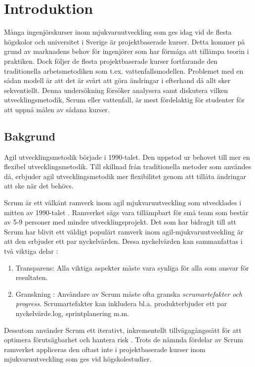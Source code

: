 \section{Introduktion}
\label{sec:Lieth_Wahid-introduction}
Många ingenjörskurser inom mjukvaruutveckling som ges idag vid de flesta högskolor och universitet i Sverige är projektbaserade
kurser. Detta kommer på grund av marknadens behov för ingenjörer som har förmåga att tillämpa teorin i praktiken. Dock följer de flesta  
projektbaserade kurser fortfarande den traditionella arbetsmetodiken som t.ex. vattenfallsmodellen. Problemet med en sådan modell är att 
det är svårt att göra ändringar i efterhand då allt sker sekventiellt. Denna undersökning försöker analysera samt diskutera vilken utvecklingsmetodik,
Scrum eller vattenfall, är mest fördelaktig för studenter för att uppnå målen av sådana kurser.

\subsection{Bakgrund}Agil utvecklingsmetodik började i 1990-talet. Den uppstod ur behovet till mer en flexibel utvecklingsmetodik. Till skillnad från traditionella metoder som användes då, erbjuder agil utvecklingsmetodik mer flexibilitet genom att tillåta ändringar att ske när det behövs.

Scrum är ett välkänt ramverk inom agil mjukvaruutveckling som utvecklades i mitten av 1990-talet \cite{TheScrum}. 
Ramverket sägs vara tillämpbart för små team som består av 5-9 personer med mindre utvecklingsprojekt. Det som har bidragit till att Scrum har blivit ett väldigt populärt ramverk inom agil-mjukvaruutveckling är att den erbjuder ett par nyckelvärden. Dessa nyckelvärden kan sammanfattas i två viktiga delar \cite{TheScrum}: 
\begin{enumerate}\label{two}
	\item Transparens: Alla viktiga aspekter måste vara synliga för alla som ansvar för resultaten\cite{TheScrum}.
	\item Granskning : Användare av Scrum måste ofta granska \textit{scrumartefakter och progress}. Scrumartefakter kan inkludera
	bl.a. produkterbjuder ett par nyckelvärde.log, sprintplanering m.m\cite{TheScrum}.
\end{enumerate} 
Dessutom använder Scrum ett iterativt, inkrementellt tillvägagångssätt för att optimera förutsägbarhet och hantera risk \cite{TheScrum}. Trots de nämnda fördelar av Scrum ramverket appliceras den oftast inte i projektbaserade kurser inom mjukvaruutveckling som ges vid högskolestudier. 

